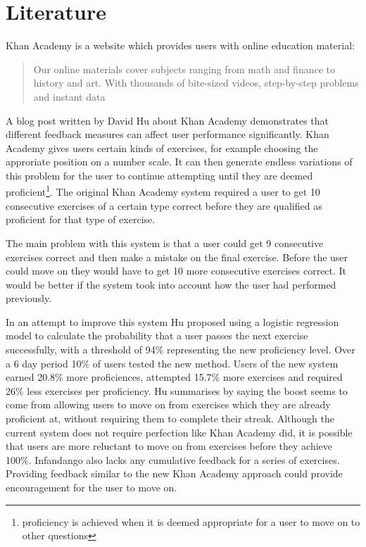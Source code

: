 \section{Literature}
Khan Academy\cite{khan_site} is a website which provides users with online education material:
\begin{quote}
Our online materials cover subjects ranging from math and finance to history and art.  With thousands of bite-sized videos, step-by-step problems and instant data\cite{ka_faq}
\end{quote}


A blog post\cite{khan_blog} written by David Hu about Khan Academy demonstrates that different feedback measures can affect user performance significantly. Khan Academy gives users certain kinds of exercises, for example choosing the approriate position on a number scale. It can then generate endless variations of this problem for the user to continue attempting until they are deemed proficient\footnote{
proficiency is achieved when it is deemed appropriate for a user to move on to other questions
}. The original Khan Academy system required a user to get 10 consecutive exercises of a certain type correct before they are qualified as proficient for that type of exercise. 

The main problem with this system is that a user could get 9 consecutive exercises correct and then make a mistake on the final exercise. Before the user could move on they would have to get 10 more consecutive exercises correct. It would be better if the system took into account how the user had performed previously. 

In an attempt to improve this system Hu proposed using a logistic regression model to calculate the probability that a user passes the next exercise successfully, with a threshold of 94\% representing the new proficiency level. Over a 6 day period 10\% of users tested the new method. Users of the new system earned 20.8\% more proficiences, attempted 15.7\% more exercises and required 26\% less exercises per proficiency. Hu summarises by saying the boost seems to come from allowing users to move on from exercises which they are already proficient at, without requiring them to complete their streak.
Although the current system does not require perfection like Khan Academy did, it is possible that users are more reluctant to move on from exercises before they achieve 100\%. Infandango also lacks any cumulative feedback for a series of exercises. Providing feedback similar to the new Khan Academy approach could provide encouragement for the user to move on.

